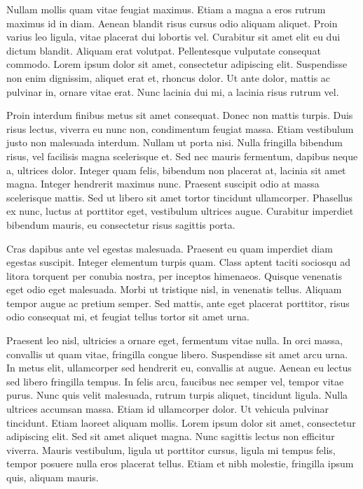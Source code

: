 Nullam mollis quam vitae feugiat maximus. Etiam a magna a eros rutrum maximus id in diam. Aenean blandit risus cursus odio aliquam aliquet. Proin varius leo ligula, vitae placerat dui lobortis vel. Curabitur sit amet elit eu dui dictum blandit. Aliquam erat volutpat. Pellentesque vulputate consequat commodo. Lorem ipsum dolor sit amet, consectetur adipiscing elit. Suspendisse non enim dignissim, aliquet erat et, rhoncus dolor. Ut ante dolor, mattis ac pulvinar in, ornare vitae erat. Nunc lacinia dui mi, a lacinia risus rutrum vel.

Proin interdum finibus metus sit amet consequat. Donec non mattis turpis. Duis risus lectus, viverra eu nunc non, condimentum feugiat massa. Etiam vestibulum justo non malesuada interdum. Nullam ut porta nisi. Nulla fringilla bibendum risus, vel facilisis magna scelerisque et. Sed nec mauris fermentum, dapibus neque a, ultrices dolor. Integer quam felis, bibendum non placerat at, lacinia sit amet magna. Integer hendrerit maximus nunc. Praesent suscipit odio at massa scelerisque mattis. Sed ut libero sit amet tortor tincidunt ullamcorper. Phasellus ex nunc, luctus at porttitor eget, vestibulum ultrices augue. Curabitur imperdiet bibendum mauris, eu consectetur risus sagittis porta.

Cras dapibus ante vel egestas malesuada. Praesent eu quam imperdiet diam egestas suscipit. Integer elementum turpis quam. Class aptent taciti sociosqu ad litora torquent per conubia nostra, per inceptos himenaeos. Quisque venenatis eget odio eget malesuada. Morbi ut tristique nisl, in venenatis tellus. Aliquam tempor augue ac pretium semper. Sed mattis, ante eget placerat porttitor, risus odio consequat mi, et feugiat tellus tortor sit amet urna.

Praesent leo nisl, ultricies a ornare eget, fermentum vitae nulla. In orci massa, convallis ut quam vitae, fringilla congue libero. Suspendisse sit amet arcu urna. In metus elit, ullamcorper sed hendrerit eu, convallis at augue. Aenean eu lectus sed libero fringilla tempus. In felis arcu, faucibus nec semper vel, tempor vitae purus. Nunc quis velit malesuada, rutrum turpis aliquet, tincidunt ligula. Nulla ultrices accumsan massa. Etiam id ullamcorper dolor. Ut vehicula pulvinar tincidunt. Etiam laoreet aliquam mollis. Lorem ipsum dolor sit amet, consectetur adipiscing elit. Sed sit amet aliquet magna. Nunc sagittis lectus non efficitur viverra. Mauris vestibulum, ligula ut porttitor cursus, ligula mi tempus felis, tempor posuere nulla eros placerat tellus. Etiam et nibh molestie, fringilla ipsum quis, aliquam mauris.


